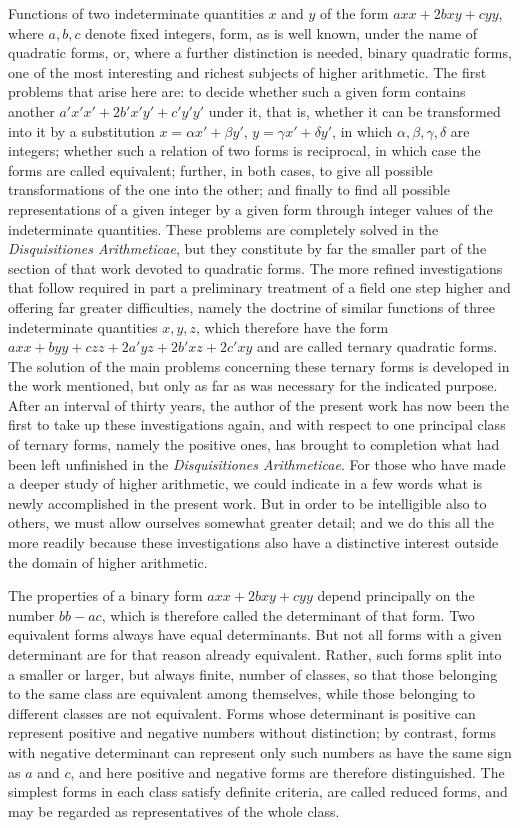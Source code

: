 \documentclass[12pt]{article}
\begin{document}
Functions of two indeterminate quantities $x$ and $y$ of the form $axx+2bxy+cyy$, where $a,b,c$ denote fixed integers, form, as is well known, under the name of quadratic forms, or, where a further distinction is needed, binary quadratic forms, one of the most interesting and richest subjects of higher arithmetic. The first problems that arise here are: to decide whether such a given form contains another $a'x'x'+2b'x'y'+c'y'y'$ under it, that is, whether it can be transformed into it by a substitution $x=\alpha x'+\beta y'$, $y=\gamma x'+\delta y'$, in which $\alpha,\beta,\gamma,\delta$ are integers; whether such a relation of two forms is reciprocal, in which case the forms are called equivalent; further, in both cases, to give all possible transformations of the one into the other; and finally to find all possible representations of a given integer by a given form through integer values of the indeterminate quantities. These problems are completely solved in the \textit{Disquisitiones Arithmeticae}, but they constitute by far the smaller part of the section of that work devoted to quadratic forms. The more refined investigations that follow required in part a preliminary treatment of a field one step higher and offering far greater difficulties, namely the doctrine of similar functions of three indeterminate quantities $x,y,z$, which therefore have the form $axx+byy+czz+2a'yz+2b'xz+2c'xy$ and are called ternary quadratic forms. The solution of the main problems concerning these ternary forms is developed in the work mentioned, but only as far as was necessary for the indicated purpose. After an interval of thirty years, the author of the present work has now been the first to take up these investigations again, and with respect to one principal class of ternary forms, namely the positive ones, has brought to completion what had been left unfinished in the \textit{Disquisitiones Arithmeticae}. For those who have made a deeper study of higher arithmetic, we could indicate in a few words what is newly accomplished in the present work. But in order to be intelligible also to others, we must allow ourselves somewhat greater detail; and we do this all the more readily because these investigations also have a distinctive interest outside the domain of higher arithmetic.

The properties of a binary form $axx+2bxy+cyy$ depend principally on the number $bb-ac$, which is therefore called the determinant of that form. Two equivalent forms always have equal determinants. But not all forms with a given determinant are for that reason already equivalent. Rather, such forms split into a smaller or larger, but always finite, number of classes, so that those belonging to the same class are equivalent among themselves, while those belonging to different classes are not equivalent. Forms whose determinant is positive can represent positive and negative numbers without distinction; by contrast, forms with negative determinant can represent only such numbers as have the same sign as $a$ and $c$, and here positive and negative forms are therefore distinguished. The simplest forms in each class satisfy definite criteria, are called reduced forms, and may be regarded as representatives of the whole class.
\end{document}

